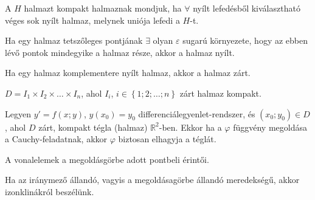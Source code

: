 \begin{definition}
  A $H$ halmazt kompakt halmaznak mondjuk, ha $\forall$ nyílt lefedésből
  kiválasztható véges sok nyílt halmaz, melynek uniója lefedi a $H$-t.
\end{definition}

\begin{definition}
  Ha egy halmaz tetszőleges pontjának $\exists$ olyan $\varepsilon$ sugarú
  környezete, hogy az ebben lévő pontok mindegyike a halmaz része, akkor a
  halmaz nyílt.
\end{definition}

\begin{definition}
  Ha egy halmaz komplementere nyílt halmaz, akkor a halmaz zárt.
\end{definition}

\begin{statement}
  $D = I_1 \times I_2 \times \dots \times I_n$, ahol
  $I_i$, $i \in \left\{1;2;\dots;n\right\}$ zárt halmaz kompakt.
\end{statement}

\begin{theorem}[nobreak]
  Legyen $y' = f(x; y)$, $y(x_0) = y_0$ differenciálegyenlet-rendszer, és
  $\left( x_0; y_0 \right) \in D$, ahol $D$ zárt, kompakt tégla (halmaz)
  $\mathbb{R}^2$-ben. Ekkor ha a $\varphi$ függvény megoldása a
  Cauchy-feladatnak, akkor $\varphi$ biztosan elhagyja a téglát.
\end{theorem}

\begin{definition}
  A vonalelemek a megoldásgörbe adott pontbeli érintői.

  Ha az iránymező állandó, vagyis a megoldásagörbe állandó meredekségű, akkor
  izonklinákról beszélünk.
\end{definition}
